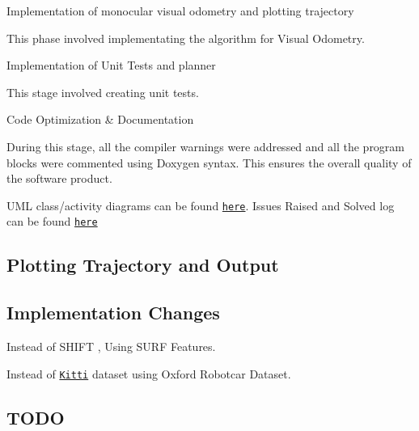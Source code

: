 \begin{DoxyEnumerate}
\item Implementation of monocular visual odometry and plotting trajectory
\begin{DoxyItemize}
\item This phase involved implementating the algorithm for Visual Odometry.
\end{DoxyItemize}
\item Implementation of Unit Tests and planner
\begin{DoxyItemize}
\item This stage involved creating unit tests.
\end{DoxyItemize}
\item Code Optimization \& Documentation
\begin{DoxyItemize}
\item During this stage, all the compiler warnings were addressed and all the program blocks were commented using Doxygen syntax. This ensures the overall quality of the software product.
\end{DoxyItemize}
\end{DoxyEnumerate}

U\+ML class/activity diagrams can be found \href{https://github.com/bhargavipatel/808X_VO/tree/master/UML}{\tt here}. Issues Raised and Solved log can be found \href{https://github.com/bhargavipatel/808X_VO/issues}{\tt here}

\subsection*{Plotting Trajectory and Output}

 

\subsection*{Implementation Changes}


\begin{DoxyItemize}
\item Instead of S\+H\+I\+FT , Using S\+U\+RF Features.
\item Instead of \href{http://www.cvlibs.net/datasets/kitti/eval_odometry.php}{\tt Kitti} dataset using Oxford Robotcar Dataset.
\end{DoxyItemize}

\subsection*{T\+O\+DO}


